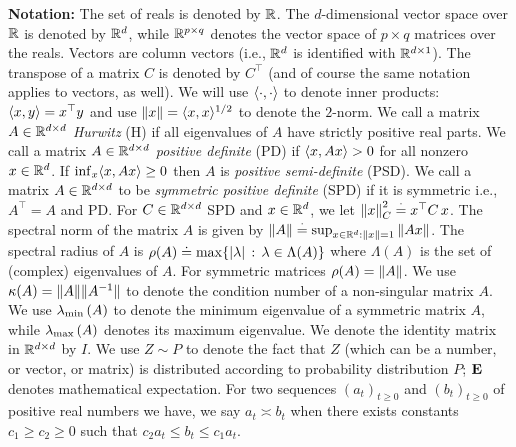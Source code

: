 \textbf{Notation:} The set of reals is denoted by $\mathbb{R}$. 
The $d$-dimensional vector space over $\mathbb{R}$ is denoted by $\mathbb{R}^{d}$,
while $\mathbb{R}^{p\times q}$ denotes the vector space of $p\times q$ matrices over the reals.
Vectors are column vectors (i.e., $\mathbb{R}^d$ is identified with $\mathbb{R}^{d\times 1}$).
The transpose of a matrix $C$ is denoted by $C^\top$
(and of course the same notation applies to vectors, as well). 
We will use $\langle\cdot,\cdot\rangle$ to denote inner products: $\langle x,y\rangle=x^\top y$
and use $\left\| x\right\| = \langle x,x\rangle^{1/2}$ to denote the $2$-norm.
We call a matrix $A\in \mathbb{R}^{d \times d}$  \emph{Hurwitz} (H) if all eigenvalues of $A$ have strictly positive real parts. 
We call a matrix $A\in \mathbb{R}^{d \times d}$ \emph{positive definite} (PD) if $\langle x,Ax\rangle >0$ for all nonzero $x \in \mathbb{R}^{d}$.
If $\inf_x \langle x,Ax\rangle\ge 0$ then $A$ is \emph{positive semi-definite} (PSD).
We call a matrix $A\in \mathbb{R}^{d \times d}$ to be \emph{symmetric positive definite} (SPD) if 
it is symmetric i.e., $A^\top=A$ and PD. 
For $C\in \mathbb{R}^{d \times d}$ SPD and $x\in \mathbb{R}^d$, we let $\left\| x\right\|^2_C\stackrel{\cdot}{=} x^\top C \,x$.
The spectral norm of the matrix $A$ is given by $\left\| A\right\|\stackrel{\cdot}{=} \sup_{x\in \mathbb{R}^d:\left\| x\right\|=1} \left\| Ax\right\|$.  
The spectral radius of $A$ is $\rho(A)\doteq \max\{ |\lambda|\,:\, \lambda \in \Lambda(A) \}$ where $\Lambda(A)$ is the set of (complex) eigenvalues of $A$. For symmetric matrices $\rho(A) = \left\| A\right\|$.
We use $\kappa(A)=\| A\|\| A^{-1}\|$ to denote the condition number of a non-singular matrix $A$. 
We use $\lambda_{\min}\left(A\right)$ to denote the minimum eigenvalue of a symmetric matrix $A$, while $\lambda_{\max}\left(A\right)$ denotes its maximum eigenvalue.
We denote the identity matrix in $\mathbb{R}^{d \times d}$ by $I$. 
We use $Z\sim P$ to denote the fact that $Z$ (which can be a number, or vector, or matrix) is distributed according to probability distribution $P$; $\mathbf{E}$ denotes mathematical expectation. For two sequences $(a_t)_{t\geq 0}$ and $(b_t)_{t\geq 0}$ of positive real numbers we have, we say $a_t\asymp b_t$ when there exists constants $c_1\geq c_2\geq 0$ such that $c_2 a_t\leq b_t\leq c_1 a_t$.
